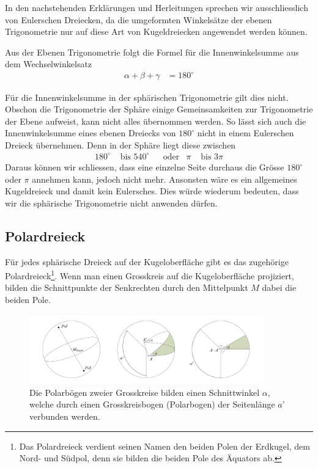 \begin{refsection}
In den nachstehenden Erklärungen und Herleitungen sprechen wir ausschliesslich von Eulerschen Dreiecken, da die umgeformten Winkelsätze der ebenen Trigonometrie nur auf diese Art von Kugeldreiecken angewendet werden können.

Aus der Ebenen Trigonometrie folgt die Formel für die Innenwinkelsumme aus dem Wechselwinkelsatz
\begin{align*}
\alpha + \beta + \gamma &= 180^{\circ}
\end{align*}

Für die Innenwinkelsumme in der sphärischen Trigonometrie gilt dies nicht. Obschon die Trigonometrie der Sphäre einige Gemeinsamkeiten zur Trigonometrie der Ebene aufweist, kann nicht alles übernommen werden.
So lässt sich auch die Innenwinkelsumme eines ebenen Dreiecks von $180^{\circ}$ nicht in einem Eulerschen Dreieck übernehmen.
Denn in der Sphäre liegt diese zwischen
\[
\begin{aligned}
180^{\circ}
&\text{ bis }
540^{\circ}
&
&\text{oder}
&
\pi
&\text{ bis }
3\pi
\end{aligned}
\]
Daraus können wir schliessen, dass eine einzelne Seite durchaus die Grösse $180^{\circ}$ oder $\pi$ annehmen kann, jedoch nicht mehr. Ansonsten wäre es ein allgemeines Kugeldreieck und damit kein Eulersches. Dies würde wiederum bedeuten, dass wir die sphärische Trigonometrie nicht anwenden dürfen.


\subsection{Polardreieck}
Für jedes sphärische Dreieck auf der Kugeloberfläche gibt es das zugehörige Polardreieck\footnote{%
Das Polardreieck verdient seinen Namen den beiden Polen der Erdkugel, dem Nord- und Südpol, denn sie bilden die beiden Pole des Äquators ab.}. Wenn man einen Grosskreis auf die Kugeloberfläche projiziert, bilden die Schnittpunkte der Senkrechten durch den Mittelpunkt $M$ dabei die beiden Pole. 

\begin{figure}[htbp]
\centering
\includegraphics[width=0.9\textwidth]{kugel/Polar.jpg}
\caption{Die Polarbögen zweier Grosskreise bilden einen Schnittwinkel $\alpha$, welche durch einen Grosskreisbogen (Polarbogen) der Seitenlänge $a’$ verbunden werden.}
\label{V8}
\end{figure}


\end{refsection}
